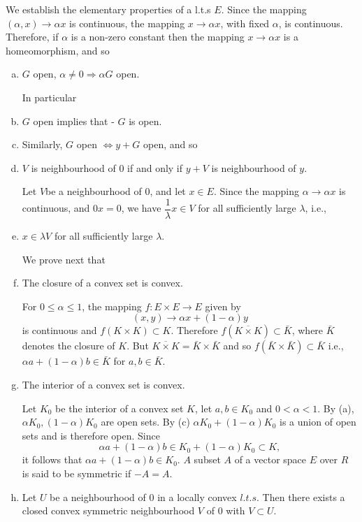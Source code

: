 We establish the elementary properties of a l.t.s $E$. Since the
mapping $(\alpha, x) \to \alpha x$ is continuous, the mapping $ x  \to
\alpha x$, with fixed $\alpha$, is continuous. Therefore, if $\alpha$
is a non-zero constant then the mapping $x \to \alpha x$ is a
homeomorphism, and so 
\begin{enumerate}[a)]
\item $G$ open, $\alpha \neq 0 \Longrightarrow \alpha G$ open.

In particular
\item $G$ open implies that - $G$ is open.
\item Similarly, $G$ open $\Longleftrightarrow y + G$ open, and so
\item $V$ is neighbourhood of $0$ if and only if $y + V$ is
  neighbourhood of $y$. 

  Let $V$\pageoriginale be a neighbourhood of $0$, and let $x \in
  E$. Since the 
  mapping $\alpha \to \alpha x$ is continuous, and $0x =0$, we have
  $\dfrac{1}{\lambda}x \in V$ for all sufficiently large $\lambda$,
  i.e., 

\item $x \in \lambda V$ for all sufficiently large $\lambda$.

  We prove next that

\item The closure of a convex set is convex.
  
  For $0 \leq \alpha \leq 1$, the mapping $f : E \times E \to E$  given by 
  $$
  (x,y) \to \alpha x + (1- \alpha)y
  $$
  is continuous and $f(K \times K) \subset K$. Therefore $f
  (\overline{K \times K}) \subset \bar{K}$, where $\bar{K}$ denotes
  the closure of $K$. But $\overline{K \times K}= \bar{K}\times
  \bar{K}$ and so $f(\bar{K} \times \bar{K}) \subset \bar{K}$
  i.e., $\alpha a+ (1-\alpha)b \in \bar{K}$ for $a, b \in \bar{K}$. 

\item The interior of a convex set is convex.

  Let $K_0$ be the interior of a convex set $K$, let $a,b \in K_0$ and
  $0 < \alpha < 1$. By (a), $\alpha K_0, (1-\alpha)K_0$ are open
  sets. By (c) $ \alpha K_0 + (1-\alpha)K_0$ is a union of open sets
  and is therefore open. Since 
  $$
  \alpha a + (1- \alpha) b \in K_0 + (1-\alpha)  K_0 \subset K,
  $$
  it follows that $\alpha a+(1-\alpha)b \in K_0$. $A$ subset $A$ of a
  vector space $E$ over $R$ is said to be symmetric if $-A = A$. 

\item Let $U$ be a neighbourhood of 0 in a locally convex
  $l.t.s$. Then there exists a closed convex symmetric neighbourhood
  $V$ of 0 with $V \subset U$. 


\end{enumerate}
